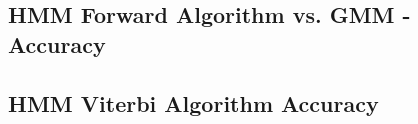 \documentclass[parskip=half]{scrartcl}
\begin{document}


    \subsection{HMM Forward Algorithm vs. GMM - Accuracy} %
    \label{sub:hmm_forward_algorithm_vs_gmm_accuracy}
    


    \subsection{HMM Viterbi Algorithm Accuracy} %
    \label{sub:hmm_viterbi_algorithm_accuracy}
    

\end{document}
